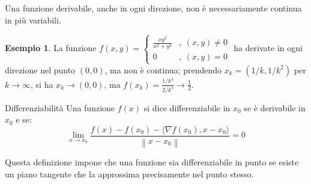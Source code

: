\documentclass[11pt, a4paper]{scrartcl}
\theoremstyle{definition}
\newtheorem{esempio}{Esempio}
\numberwithin{esempio}{section}
\theoremstyle{definition}
\numberwithin{obs}{section}
\numberwithin{nota}{section}
\numberwithin{equation}{subsection}
\begin{document}
Una funzione derivabile, anche in ogni direzione, non \`e necessariamente continua in pi\`u variabili.
\begin{esempio}
	La funzione $f(x,y) = \begin{cases}
		\frac{xy^2}{x^2 + y^2}& , \ (x,y)\neq 0\\
		0 & , \ (x,y) =0 
	\end{cases}$ ha derivate in ogni direzione nel punto $(0,0)$, ma non \`e continua; prendendo $x_k = (1 / k , 1/k^2)$ per $k\to \infty$, si ha $x_k\to (0,0)$, ma $f(x_k) = \frac{1/k^4}{2 / k^4} \to \frac{1}{2}$.
\end{esempio}

\begin{definizione}{Differenziabilit\`a}{}
	Una funzione $f(x)$ si dice differenziabile in $x_0$ se \`e derivabile in $x_0 $ e se:
	\begin{equation}
		\lim_{x \to x_0} \frac{f(x) - f(x_0) - \langle \nabla f(x_0) , x -x_0 \rangle}{\left\lVert x - x_0 \right\rVert } = 0
	\end{equation}
\end{definizione}
\noindent Questa definizione impone che una funzione sia differenziabile in punto se esiste un piano tangente che la approssima precisamente nel punto stesso.
\end{document}
